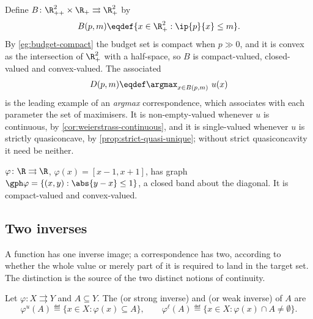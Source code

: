 \begin{eg}\label{eg:budget-correspondence}
	Define $B\colon\R^{2}_{++}\times\R_+\rightrightarrows\R^2_+$ by
	\begin{equation}\label{eq:budget-correspondence}
		B(p,m)\eqdef\{x\in\R^2_+ : \ip{p}{x}\leq m\} .
	\end{equation}
	By \autoref{eg:budget-compact} the budget set is compact when $p\gg0$, and it is
	convex as the intersection of $\R^2_+$ with a half-space, so $B$ is
	compact-valued, closed-valued and convex-valued. The associated 
	\begin{equation}\label{eq:demand-correspondence}
		D(p,m)\eqdef\argmax_{x\in B(p,m)}\ u(x)
	\end{equation}
	is the leading example of an \emph{argmax} correspondence, which associates with
	each parameter the set of maximisers. It is non-empty-valued whenever $u$ is
	continuous, by \autoref{cor:weierstrass-continuous}, and it is single-valued
	whenever $u$ is strictly quasiconcave, by
	\autoref{prop:strict-quasi-unique}; without strict quasiconcavity it need be
	neither.
\end{eg}

\begin{eg}\label{eg:band}
	$\varphi\colon\R\rightrightarrows\R$, $\varphi(x)=[x-1,x+1]$, has graph
	$\gph\varphi=\{(x,y) : \abs{y-x}\leq1\}$, a closed band about the diagonal. It is
	compact-valued and convex-valued.
\end{eg}

\subsection{Two inverses}

A function has one inverse image; a correspondence has two, according to whether
the whole value or merely part of it is required to land in the target set. The
distinction is the source of the two distinct notions of continuity.

\begin{definition}\label{def:corr-inverse}
	Let $\varphi\colon X\rightrightarrows Y$ and $A\subseteq Y$. The  (or strong inverse) and  (or weak inverse) of $A$ are
	\begin{equation}\label{eq:corr-inverses}
		\varphi^{u}(A)\eqdef\{x\in X : \varphi(x)\subseteq A\},
		\qquad
		\varphi^{\ell}(A)\eqdef\{x\in X : \varphi(x)\cap A\neq\emptyset\} .
	\end{equation}
\end{definition}

